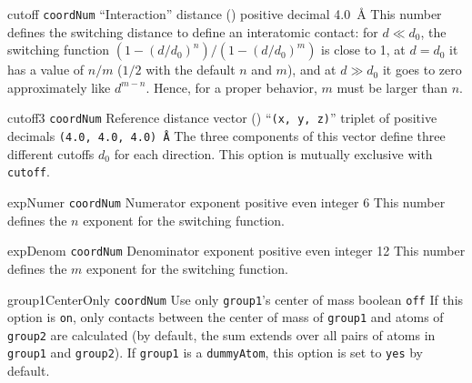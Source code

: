 \begin{cvcoptions}

\item %

\item %

\item %
  \keydef
    {cutoff}{%
    \texttt{coordNum}}{%
    ``Interaction'' distance (\lengthunit)}{%
    positive decimal}{%
    4.0~\AA{}}{%
    This number defines the switching distance to define an
    interatomic contact: for $d \ll d_0$, the switching function
    $(1-(d/d_0)^{n})/(1-(d/d_0)^{m})$ is close to 1, at $d = d_0$ it
    has a value of $n/m$ ($1/2$ with the default $n$ and $m$), and at
    $d \gg d_0$ it goes to zero approximately like $d^{m-n}$.  Hence,
    for a proper behavior, $m$ must be larger than $n$.}

\item %
  \keydef
    {cutoff3}{%
    \texttt{coordNum}}{%
    Reference distance vector (\lengthunit)}{%
    ``\texttt{(x, y, z)}'' triplet of positive decimals}{%
    \texttt{(4.0, 4.0, 4.0)~\AA}}{%
    The three components of this vector define three different cutoffs
    $d_{0}$ for each direction.  This option is mutually exclusive with
    \texttt{cutoff}.}

\item %
  \keydef
    {expNumer}{%
    \texttt{coordNum}}{%
    Numerator exponent}{%
    positive even integer}{%
    6}{%
    This number defines the $n$ exponent for the switching function.}

\item %
  \keydef
    {expDenom}{%
    \texttt{coordNum}}{%
    Denominator exponent}{%
    positive even integer}{%
    12}{%
    This number defines the $m$ exponent for the switching function.}

\item %
  \keydef
    {group1CenterOnly}{%
    \texttt{coordNum}}{%
    Use only \texttt{group1}'s center of
    mass}{%
    boolean}{%
    \texttt{off}}{%
    If this option is \texttt{on}, only contacts between the center of mass of \texttt{group1} and atoms of \texttt{group2} are calculated (by default, the sum extends over all pairs of atoms in \texttt{group1} and \texttt{group2}).
    If \texttt{group1} is a \texttt{dummyAtom}, this option is set to \texttt{yes} by default.
}


\end{cvcoptions}
